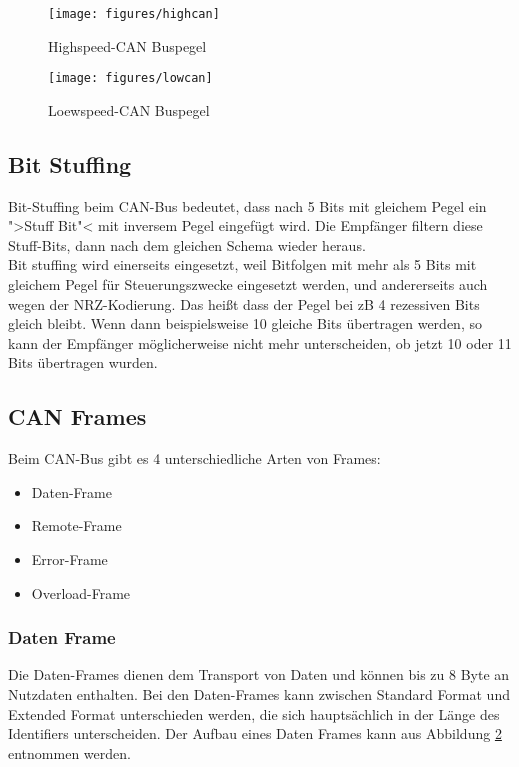 \begin{figure}[h] 
\centering
\texttt{[image: figures/highcan]}
\caption{Highspeed-CAN Buspegel \citep{VEC}} 
\label{data}
\end{figure} 

\begin{figure}[h] 
\centering
\texttt{[image: figures/lowcan]}
\caption{Loewspeed-CAN Buspegel \citep{VEC}} 
\label{data}
\end{figure} 
	
\subsection{Bit Stuffing} 
Bit-Stuffing beim CAN-Bus bedeutet, dass
nach 5 Bits mit gleichem Pegel ein ">Stuff Bit"< mit inversem Pegel
eingefügt wird. Die Empfänger filtern diese Stuff-Bits, dann nach dem
gleichen Schema wieder heraus.
\\ Bit stuffing wird einerseits
eingesetzt, weil Bitfolgen mit mehr als 5 Bits mit gleichem Pegel für
Steuerungszwecke eingesetzt werden, und andererseits auch wegen der
NRZ-Kodierung. Das heißt dass der Pegel bei zB 4 rezessiven Bits
gleich bleibt. Wenn dann beispielsweise 10 gleiche Bits übertragen
werden, so kann der Empfänger möglicherweise nicht mehr unterscheiden,
ob jetzt 10 oder 11 Bits übertragen wurden.
	
\subsection{CAN Frames} Beim CAN-Bus gibt es 4 unterschiedliche Arten
von Frames: 
\begin{itemize} 
\item Daten-Frame 
\item Remote-Frame 
\item Error-Frame 
\item Overload-Frame 
\end{itemize} 

\subsubsection{Daten Frame} 
Die Daten-Frames dienen dem Transport von Daten und können bis
zu 8 Byte an Nutzdaten enthalten. Bei den Daten-Frames kann zwischen
Standard Format und Extended Format unterschieden werden, die sich
hauptsächlich in der Länge des Identifiers unterscheiden. Der Aufbau
eines Daten Frames kann aus Abbildung \ref{data} entnommen werden.
	
